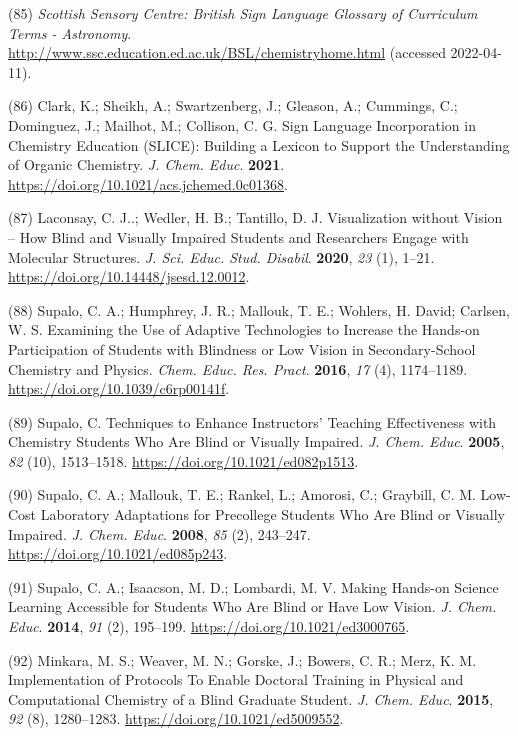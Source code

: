 \documentclass[11.5pt]{sig-alternate} %
\begin{document}
(85)	\textit{Scottish Sensory Centre: British Sign Language Glossary of Curriculum Terms - Astronomy}. \url{http://www.ssc.education.ed.ac.uk/BSL/chemistryhome.html} (accessed 2022-04-11).

(86)	Clark, K.; Sheikh, A.; Swartzenberg, J.; Gleason, A.; Cummings, C.; Dominguez, J.; Mailhot, M.; Collison, C. G. Sign Language Incorporation in Chemistry Education (SLICE): Building a Lexicon to Support the Understanding of Organic Chemistry. \textit{J. Chem. Educ}. \textbf{2021}. \url{https://doi.org/10.1021/acs.jchemed.0c01368}.

(87)	Laconsay, C. J..; Wedler, H. B.; Tantillo, D. J. Visualization without Vision – How Blind and Visually Impaired Students and Researchers Engage with Molecular Structures. \textit{J. Sci. Educ. Stud. Disabil}. \textbf{2020}, \textit{23} (1), 1–21. \url{https://doi.org/10.14448/jsesd.12.0012}.

(88)	Supalo, C. A.; Humphrey, J. R.; Mallouk, T. E.; Wohlers, H. David; Carlsen, W. S. Examining the Use of Adaptive Technologies to Increase the Hands-on Participation of Students with Blindness or Low Vision in Secondary-School Chemistry and Physics. \textit{Chem. Educ. Res. Pract}. \textbf{2016}, \textit{17} (4), 1174–1189. \url{https://doi.org/10.1039/c6rp00141f}.

(89)	Supalo, C. Techniques to Enhance Instructors’ Teaching Effectiveness with Chemistry Students Who Are Blind or Visually Impaired. \textit{J. Chem. Educ}. \textbf{2005}, \textit{82} (10), 1513–1518. \url{https://doi.org/10.1021/ed082p1513}.

(90)	Supalo, C. A.; Mallouk, T. E.; Rankel, L.; Amorosi, C.; Graybill, C. M. Low-Cost Laboratory Adaptations for Precollege Students Who Are Blind or Visually Impaired. \textit{J. Chem. Educ}. \textbf{2008}, \textit{85} (2), 243–247. \url{https://doi.org/10.1021/ed085p243}.

(91)	Supalo, C. A.; Isaacson, M. D.; Lombardi, M. V. Making Hands-on Science Learning Accessible for Students Who Are Blind or Have Low Vision. \textit{J. Chem. Educ}. \textbf{2014}, \textit{91} (2), 195–199. \url{https://doi.org/10.1021/ed3000765}.

(92)	Minkara, M. S.; Weaver, M. N.; Gorske, J.; Bowers, C. R.; Merz, K. M. Implementation of Protocols To Enable Doctoral Training in Physical and Computational Chemistry of a Blind Graduate Student. \textit{J. Chem. Educ}. \textbf{2015}, \textit{92} (8), 1280–1283. \url{https://doi.org/10.1021/ed5009552}.
\end{document}
